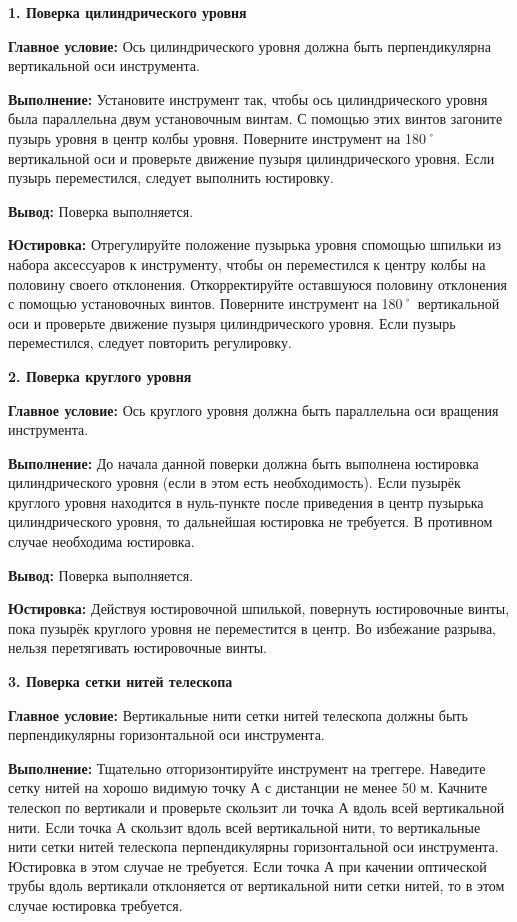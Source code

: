 \documentclass[a4paper]{article}
\begin{document}
\begin{newpage}

\large{
    \par\textbf{1. Поверка цилиндрического уровня}
    \par\textbf{Главное условие:} Ось цилиндрического уровня должна быть перпендикулярна вертикальной оси инструмента.
    \par\textbf{Выполнение:} Установите инструмент так, чтобы ось
    цилиндрического уровня была параллельна двум установочным
    винтам. С помощью этих винтов загоните пузырь уровня в центр
    колбы уровня. Поверните инструмент на 180˚ вертикальной оси и проверьте
    движение пузыря цилиндрического уровня. Если пузырь переместился, следует выполнить юстировку.
    \par\textbf{Вывод:} Поверка выполняется.
    \par\textbf{Юстировка:} Отрегулируйте положение пузырька уровня спомощью шпильки из набора аксессуаров к инструменту, чтобы он переместился к центру колбы на половину своего отклонения. Откорректируйте оставшуюся половину отклонения с помощью установочных винтов. Поверните инструмент на 180˚ вертикальной оси и проверьте движение пузыря цилиндрического уровня. Если пузырь переместился, следует повторить регулировку.
}
\large{
    \par\textbf{2. Поверка круглого уровня}
    \par\textbf{Главное условие:} Ось круглого уровня должна быть параллельна оси вращения инструмента.
    \par\textbf{Выполнение:} До начала данной поверки должна
    быть выполнена юстировка цилиндрического уровня (если в этом
    есть необходимость). Если пузырёк круглого уровня находится в
    нуль-пункте после приведения в центр пузырька цилиндрического уровня, то дальнейшая юстировка не требуется. В противном случае необходима юстировка.
    \par\textbf{Вывод:} Поверка выполняется.
    \par\textbf{Юстировка:} Действуя юстировочной шпилькой, повернуть
    юстировочные винты, пока пузырёк круглого уровня не переместится в центр. Во избежание разрыва, нельзя перетягивать юстировочные винты.
}
\large{
    \par\textbf{3. Поверка сетки нитей телескопа}
    \par\textbf{Главное условие:} Вертикальные нити сетки нитей телескопа должны быть перпендикулярны горизонтальной оси инструмента.
    \par\textbf{Выполнение:} Тщательно отгоризонтируйте инструмент на треггере. Наведите сетку нитей на хорошо видимую точку А с дистанции не менее 50 м. Качните телескоп по вертикали и проверьте скользит ли точка А вдоль всей вертикальной нити. Если точка А скользит вдоль всей вертикальной нити, то вертикальные нити сетки нитей телескопа перпендикулярны горизонтальной оси инструмента. Юстировка в этом случае не требуется. Если точка А при качении оптической трубы вдоль вертикали отклоняется от вертикальной нити сетки нитей, то в этом случае юстировка требуется.
}
\end{newpage}
\end{document}
